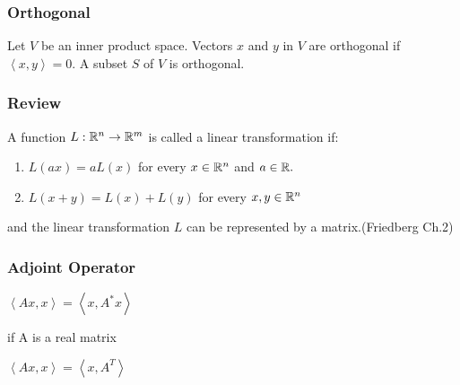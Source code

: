 \begin{frame}
	\frametitle{Orthogonal}

	Let $V$ be an inner product space. Vectors $x$ and $y$ in $V$ are orthogonal if $\left< x, y \right> = 0$. A subset $S$ of $V$ is orthogonal.
\end{frame}

\begin{frame}
	\frametitle{Review}
	A function $L: \mathbb{R}^n \rightarrow \mathbb{R}^m$ is called a linear transformation if:
	\begin{enumerate}
	\item $L(ax) = aL(x)$ for every $x \in \mathbb{R}^n$ and $a \in \mathbb{R}.$
	\item $L(x + y) = L(x) + L(y)$ for every $x,y \in \mathbb{R}^n$
	\end{enumerate}

	and the linear transformation $L$ can be represented by a matrix.(Friedberg Ch.2)
\end{frame}

%
%
%



\begin{frame}
	\frametitle{Adjoint Operator}

	$\left< Ax,x \right> = \left< x, A^*x\right>$

	if A is a real matrix

	$\left< Ax,x \right> = \left< x, A^T\right>$
\end{frame}

